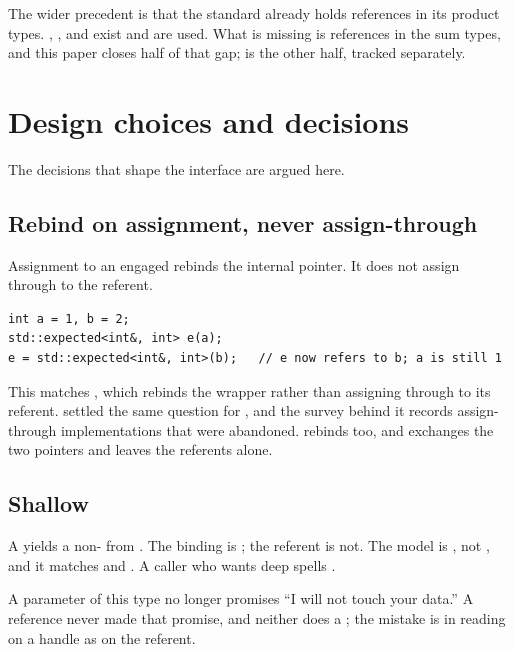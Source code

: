 \documentclass[a4paper,10pt,oneside,openany,final,article]{memoir}
\begin{document}
The wider precedent is that the standard already holds references in its
product types. , , and
 exist and are used. What is missing is references
in the sum types, and this paper closes half of that gap; 
is the other half, tracked separately.

\chapter{Design choices and decisions}

The decisions that shape the interface are argued here.

\section{Rebind on assignment, never assign-through}

Assignment to an engaged  rebinds the internal pointer.
It does not assign through to the referent.

\begin{verbatim}
int a = 1, b = 2;
std::expected<int&, int> e(a);
e = std::expected<int&, int>(b);   // e now refers to b; a is still 1
\end{verbatim}

This matches , which rebinds the
wrapper rather than assigning through to its referent. \cite{P2988R12} settled
the same question for , and the survey behind it
\cite{P1683R0} records assign-through implementations that were abandoned.
 rebinds too, and
 exchanges the two pointers and leaves the referents alone.

\section{Shallow }

A  yields a non-  from
. The binding is ; the referent is not. The model
is , not , and it matches
 and . A caller who wants deep
 spells .

A  parameter of this type no longer promises ``I will not touch
your data.'' A reference never made that promise, and neither does a
; the mistake is in reading  on a handle as
 on the referent.
\end{document}

